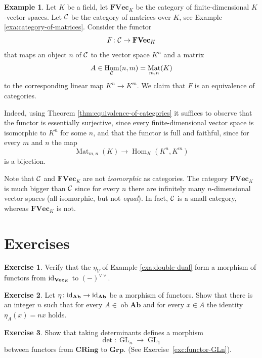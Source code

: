 \documentclass[11pt]{amsbook}
\DeclareMathOperator\Hom{Hom}
\DeclareMathOperator\GL{GL}
\renewcommand{\Vec}{\operatorname{{\bf{Vec}}}}
\DeclareMathOperator\Mat{Mat}
\DeclareMathOperator\ob{ob}
\def\id{{\rm id}}
\def\Ab{\mathbf{Ab}}
\def\Grp{\mathbf{Grp}}
\def\CRing{\mathbf{CRing}}
\def\FVec{\mathbf{FVec}}
\theoremstyle{plain}
\theoremstyle{definition}
\newtheorem{example}[theorem]{Example}
\newtheorem{exercise}{Exercise}
\begin{document}
\begin{example}
Let $K$ be a field, let $\FVec_K$ be the category of finite-dimensional $K$-vector spaces. Let ${\mathcal{C}}$ be the category of matrices over $K$, see Example \ref{exa:category-of-matrices}. Consider the functor
\[
	F\colon  \cC \to \FVec_K
\]
that maps an object $n$ of ${\mathcal{C}}$ to the vector space $K^n$ and a matrix
\[
	A \in \Hom_\cC(n,m) = \Mat_{m,n}(K)
\]
to the corresponding linear map $K^n \to K^m$. We claim that $F$ is an equivalence of categories.

Indeed, using Theorem \ref{thm:equivalence-of-categories} it suffices to observe that the functor is essentially surjective, since every finite-dimensional vector space is isomorphic to $K^n$ for some $n$, and that the functor is full and faithful, since for every $m$ and $n$ the map
\[
	\Mat_{m,n}(K) \to \Hom_K(K^n,K^m)
\]
is a bijection.

Note that ${\mathcal{C}}$ and $\FVec_K$ are not \emph{isomorphic} as categories. The category $\FVec_K$ is much bigger than ${\mathcal{C}}$ since for every $n$ there are infinitely many $n$-dimensional vector spaces (all isomorphic, but not \emph{equal}). In fact, ${\mathcal{C}}$ is a small category, whereas $\FVec_K$ is not.
\end{example}



\newpage
\section*{Exercises}


\begin{exercise}\label{exc:double-dual}
Verify that the $\eta_V$ of Example \ref{exa:double-dual} form a morphism of
functors from $\id_{\Vec_K}$ to $(-)^{\vee\vee}$.
\end{exercise}

\begin{exercise}\label{exc:endo-identity-ab}
Let $\eta \colon \id_\Ab \to \id_\Ab$ be a morphism of functors. Show that there is an integer $n$ such that  for every $A \in \ob \Ab$ and for every $x \in A$ the identity $\eta_A(x) =nx$ holds.
\end{exercise}



\begin{exercise}
Show that taking determinants defines a morphism 
\[
	\det\colon\!\GL_n \to \GL_1
\]
between functors from $\CRing$ to $\Grp$. (See Exercise~\ref{exc:functor-GLn}).
\end{exercise}
\end{document}
